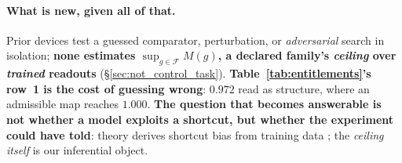 \paragraph{What is new, given all of that.} Prior devices test a guessed comparator, perturbation, or \emph{adversarial} search in isolation; \textbf{none estimates $\sup\nolimits_{g\in\mathcal{F}}M(g)$, a declared family's \emph{ceiling} over \emph{trained} readouts} (\S\ref{sec:not_control_task}). \textbf{Table~\ref{tab:entitlements}'s row~1 is the cost of guessing wrong}: $0.972$ read as structure, where an admissible map reaches $1.000$. \textbf{The question that becomes answerable is not whether a model exploits a shortcut, but whether the experiment could have told}: theory derives shortcut bias from training data \citep{lippl2025compositional}; the \emph{ceiling itself} is our inferential object.


